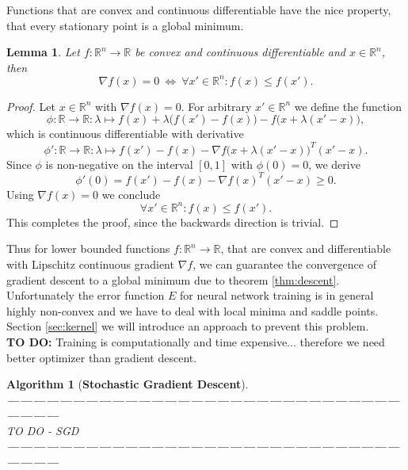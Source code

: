 \documentclass[11pt, a4paper]{article}
\newtheorem{lemma}[theorem]{Lemma}
\newtheorem{algorithm}[theorem]{Algorithm}
\newcommand{\R}{\mathds{R}}
\begin{document}
Functions that are convex and continuous differentiable have the nice property, that every stationary point is a global minimum.

\begin{lemma}
Let $f: \R^n \to \R$ be convex and continuous differentiable and $x \in \R^n$, then
\[ \nabla f(x) = 0 \ \Leftrightarrow \ \forall x' \in \R^n : f(x) \leq f(x').  \]
\end{lemma}

\begin{proof}
Let $x \in \R^n$ with $\nabla f(x) = 0$. For arbitrary $x' \in \R^n$ we define the function
\[ \phi : \R \to \R : \lambda \mapsto f(x) + \lambda \big ( f(x') - f(x) \big ) - f \big ( x + \lambda (x'-x) \big ), \]
which is continuous differentiable with derivative
\[ \phi' : \R \to \R : \lambda \mapsto f(x') - f(x) - \nabla f \big (x + \lambda(x'-x)\big )^T (x'-x). \]
Since $\phi$ is non-negative on the interval $[0,1]$ with $\phi(0) = 0$, we derive
\[ \phi'(0) = f(x') - f(x) - \nabla f(x)^T (x'-x) \geq 0. \]
Using $\nabla f(x) = 0$ we conclude
\[ \forall x' \in \R^n : f(x) \leq f(x'). \]
This completes the proof, since the backwards direction is trivial.
\end{proof}

Thus for lower bounded functions $f: \R^n \to \R$, that are convex and differentiable with Lipschitz continuous gradient $\nabla f$, we can guarantee the convergence of gradient descent to a global minimum due to theorem \ref{thm:descent}. \\

Unfortunately the error function $E$ for neural network training is in general highly non-convex and we have to deal with local minima and saddle points. Section \ref{sec:kernel} we will introduce an approach to prevent this problem. \\

\textbf{TO DO:} Training is computationally and time expensive... therefore we need better optimizer than gradient descent. \\

\begin{algorithm}[\textbf{Stochastic Gradient Descent}] \ \\
\textbf{------------------------------------------------------------------------------------------------------} \\
TO DO - SGD \\
\textbf{------------------------------------------------------------------------------------------------------} 
\end{algorithm}
\end{document}
